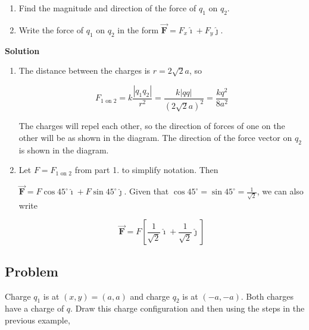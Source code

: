 \documentclass{article}
\renewcommand{\mbox}{\text}
\newcommand{\ihat}[0]{\hat{\boldsymbol{\imath}}}
\newcommand{\jhat}[0]{\hat{\boldsymbol{\jmath}}}
\newcommand{\bfvec}[1]{\vec{\mathbf{#1}}}
\begin{document}
\begin{enumerate}

  \item Find the magnitude and direction of the force of $q_1$ on $q_2$.

  \item Write the force of $q_1$ on $q_2$ in the form $\bfvec{F}=F_x\ihat + F_y\jhat$.

\end{enumerate}

\ifsolutions
\textbf{Solution}

    \begin{enumerate}

      \item The distance between the charges is $r=2\sqrt{2}a$, so

        \begin{equation}
        F_{1\mbox{ on } 2}=k\frac{|q_1q_2|}{r^2}=\frac{k|qq|}{(2\sqrt{2}a)^2}=\frac{kq^2}{8a^2}
        \end{equation}

            The charges will repel each other, so the direction of forces of one on the other will be as shown in the diagram. The direction of the force vector on $q_2$ is shown in the diagram.


      \item Let $F = F_{1\mbox{ on } 2}$ from part 1. to simplify notation. Then

            $\bfvec{F} = F\cos 45^\circ \ihat + F\sin 45^\circ \jhat$. Given that $\cos 45^\circ=\sin 45^\circ = \frac{1}{\sqrt{2}}$, we can also write

        \begin{equation}
        \bfvec{F} = F\left[\frac{1}{\sqrt{2}}\ihat + \frac{1}{\sqrt{2}}\jhat\right]
        \end{equation}

    \end{enumerate}
\fi

\subsection{Problem}

Charge $q_1$ is at $(x,y)=(a,a)$ and charge $q_2$ is at $(-a, -a)$. Both charges have a charge of $q$. Draw this charge configuration and then using the steps in the previous example,

%
\end{document}
